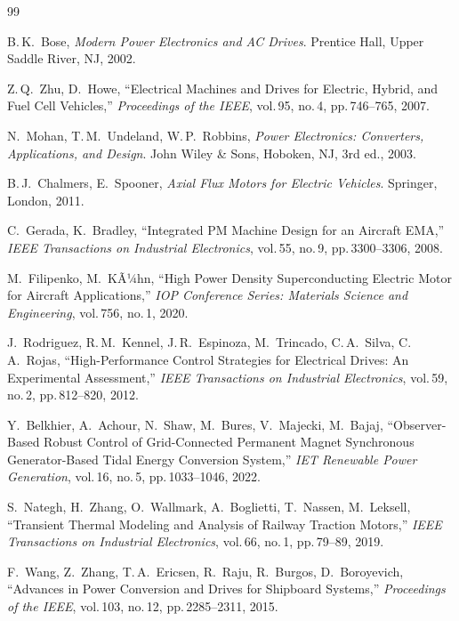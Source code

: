 ﻿\documentclass[a4paper,12pt]{article}
\theoremstyle{definition}
\begin{document}
\begin{thebibliography}{99}

B.\,K.\ Bose,
\textit{Modern Power Electronics and AC Drives}.
Prentice Hall, Upper Saddle River, NJ, 2002.

Z.\,Q.\ Zhu, D.\ Howe,
``Electrical Machines and Drives for Electric, Hybrid, and Fuel Cell Vehicles,''
\textit{Proceedings of the IEEE}, vol.\,95, no.\,4, pp.\,746--765, 2007.

N.\ Mohan, T.\,M.\ Undeland, W.\,P.\ Robbins,
\textit{Power Electronics: Converters, Applications, and Design}.
John Wiley \& Sons, Hoboken, NJ, 3rd ed., 2003.

B.\,J.\ Chalmers, E.\ Spooner,
\textit{Axial Flux Motors for Electric Vehicles}.
Springer, London, 2011.

C.\ Gerada, K.\ Bradley,
``Integrated PM Machine Design for an Aircraft EMA,''
\textit{IEEE Transactions on Industrial Electronics}, vol.\,55, no.\,9,
pp.\,3300--3306, 2008.

M.\ Filipenko, M.\ KÃ¼hn,
``High Power Density Superconducting Electric Motor for Aircraft Applications,''
\textit{IOP Conference Series: Materials Science and Engineering},
vol.\,756, no.\,1, 2020.

J.\ Rodriguez, R.\,M.\ Kennel, J.\,R.\ Espinoza, M.\ Trincado, C.\,A.\ Silva,
C.\,A.\ Rojas,
``High-Performance Control Strategies for Electrical Drives: An Experimental
Assessment,''
\textit{IEEE Transactions on Industrial Electronics}, vol.\,59, no.\,2,
pp.\,812--820, 2012.

Y.\ Belkhier, A.\ Achour, N.\ Shaw, M.\ Bures, V.\ Majecki, M.\ Bajaj,
``Observer-Based Robust Control of Grid-Connected Permanent Magnet Synchronous
Generator-Based Tidal Energy Conversion System,''
\textit{IET Renewable Power Generation}, vol.\,16, no.\,5, pp.\,1033--1046, 2022.

S.\ Nategh, H.\ Zhang, O.\ Wallmark, A.\ Boglietti, T.\ Nassen, M.\ Leksell,
``Transient Thermal Modeling and Analysis of Railway Traction Motors,''
\textit{IEEE Transactions on Industrial Electronics}, vol.\,66, no.\,1,
pp.\,79--89, 2019.

F.\ Wang, Z.\ Zhang, T.\,A.\ Ericsen, R.\ Raju, R.\ Burgos, D.\ Boroyevich,
``Advances in Power Conversion and Drives for Shipboard Systems,''
\textit{Proceedings of the IEEE}, vol.\,103, no.\,12, pp.\,2285--2311, 2015.


\end{thebibliography}
\end{document}
